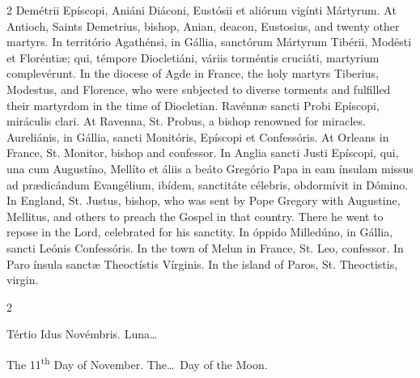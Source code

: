 \begin{paracol}{2}
 Demétrii Epíscopi, Aniáni Diáconi, Eustósii et aliórum vigínti Mártyrum.
\switchcolumn
{}
At Antioch, Saints Demetrius, 
 bishop, Anian, deacon, Eustosius, and twenty other martyrs.
\switchcolumn*
{}
In território Agathénsi, 
 in Gállia, sanctórum Mártyrum Tibérii, Modésti et Floréntiæ; qui, témpore 
 Diocletiáni, váriis torméntis cruciáti, martyrium complevérunt.
\switchcolumn
{}
In the diocese of Agde in France, 
 the holy martyrs Tiberius, Modestus, and Florence, who were subjected to 
 diverse torments and fulfilled their martyrdom in the time of Diocletian.
\switchcolumn*
{}
Ravénnæ sancti Probi 
 Epíscopi, miráculis clari.
\switchcolumn
{}
At Ravenna, St. Probus, a bishop 
 renowned for miracles.
\switchcolumn*
{}
Aureliánis, in Gállia, 
 sancti Monitóris, Epíscopi et Confessóris.
\switchcolumn
{}
At Orleans in France, St. Monitor, 
 bishop and confessor.
\switchcolumn*
{}
In Anglia sancti Justi 
 Epíscopi, qui, una cum Augustíno, Mellíto et áliis a beáto Gregório Papa in 
 eam ínsulam missus ad prædicándum Evangélium, ibídem, sanctitáte célebris, 
 obdormívit in Dómino.
\switchcolumn
{}
In England, St. Justus, bishop, who 
 was sent by Pope Gregory with Augustine, Mellitus, and others to preach the 
 Gospel in that country. There he went to repose in the Lord, 
 celebrated for his sanctity.
\switchcolumn*
{}
In óppido Milledúno, in 
 Gállia, sancti Leónis Confessóris.
\switchcolumn
{}
In the town of Melun in France, St. 
 Leo, confessor.
\switchcolumn*
{}
In Paro ínsula sanctæ 
 Theoctístis Vírginis.
\switchcolumn
{}
In the island of Paros, St. 
 Theoctistis, virgin.
\switchcolumn*
{}
\end{paracol}


\begin{paracol}{2}
\begin{center}{\color{gregoriocolor} Tértio Idus Novémbris. 
 Luna\dots\ }\end{center}
\switchcolumn
{}
\begin{center}{\color{gregoriocolor} The 
 11\textsuperscript{th} Day of 
 November. The\dots\ Day of the Moon.}\end{center}
\end{paracol}

